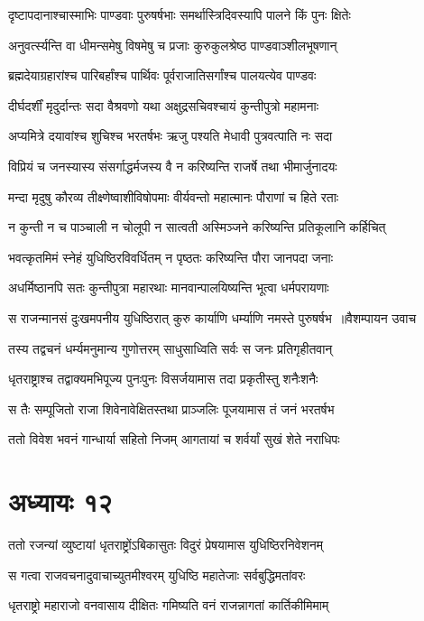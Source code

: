 \twolineshloka
{दृष्टापदानाश्चास्माभिः पाण्डवाः पुरुषर्षभाः}
{समर्थास्त्रिदिवस्यापि पालने किं पुनः क्षितेः}


\twolineshloka
{अनुवर्त्स्यन्ति वा धीमन्समेषु विषमेषु च}
{प्रजाः कुरुकुलश्रेष्ठ पाण्डवाञ्शीलभूषणान्}


\twolineshloka
{ब्रह्मदेयाग्रहारांश्च पारिबर्हांश्च पार्थिवः}
{पूर्वराजातिसर्गांश्च पालयत्येव पाण्डवः}


\twolineshloka
{दीर्घदर्शीं मृदुर्दान्तः सदा वैश्रवणो यथा}
{अक्षुद्रसचिवश्चायं कुन्तीपुत्रो महामनाः}


\twolineshloka
{अप्यमित्रे दयावांश्च शुचिश्च भरतर्षभः}
{ऋजु पश्यति मेधावी पुत्रवत्पाति नः सदा}


\twolineshloka
{विप्रियं च जनस्यास्य संसर्गाद्धर्मजस्य वै}
{न करिष्यन्ति राजर्षे तथा भीमार्जुनादयः}


\twolineshloka
{मन्दा मृदुषु कौरव्य तीक्ष्णेष्वाशीविषोपमाः}
{वीर्यवन्तो महात्मानः पौराणां च हिते रताः}


\twolineshloka
{न कुन्ती न च पाञ्चाली न चोलूपी न सात्वती}
{अस्मिञ्जने करिष्यन्ति प्रतिकूलानि कर्हिचित्}


\twolineshloka
{भवत्कृतमिमं स्नेहं युधिष्ठिरविवर्धितम्}
{न पृष्ठतः करिष्यन्ति पौरा जानपदा जनाः}


\twolineshloka
{अधर्मिष्ठानपि सतः कुन्तीपुत्रा महारथाः}
{मानवान्पालयिष्यन्ति भूत्वा धर्मपरायणाः}


\threelineshloka
{स राजन्मानसं दुःखमपनीय युधिष्ठिरात्}
{कुरु कार्याणि धर्म्याणि नमस्ते पुरुषर्षभ ॥वैशम्पायन उवाच}
{}


\twolineshloka
{तस्य तद्वचनं धर्म्यमनुमान्य गुणोत्तरम्}
{साधुसाध्विति सर्वः स जनः प्रतिगृहीतवान्}


\twolineshloka
{धृतराष्ट्राश्च तद्वाक्यमभिपूज्य पुनःपुनः}
{विसर्जयामास तदा प्रकृतीस्तु शनैःशनैः}


\twolineshloka
{स तैः सम्पूजितो राजा शिवेनावेक्षितस्तथा}
{प्राञ्जलिः पूजयामास तं जनं भरतर्षभ}


\twolineshloka
{ततो विवेश भवनं गान्धार्या सहितो निजम्}
{आगतायां च शर्वर्यां सुखं शेते नराधिपः}


\chapter{अध्यायः १२}
\twolineshloka
{ततो रजन्यां व्युष्टायां धृतराष्ट्रोंऽबिकासुतः}
{विदुरं प्रेषयामास युधिष्ठिरनिवेशनम्}


\twolineshloka
{स गत्वा राजवचनादुवाचाच्युतमीश्वरम्}
{युधिष्ठि महातेजाः सर्वबुद्धिमतांवरः}


\twolineshloka
{धृतराष्ट्रो महाराजो वनवासाय दीक्षितः}
{गमिष्यति वनं राजन्नागतां कार्तिकीमिमाम्}


